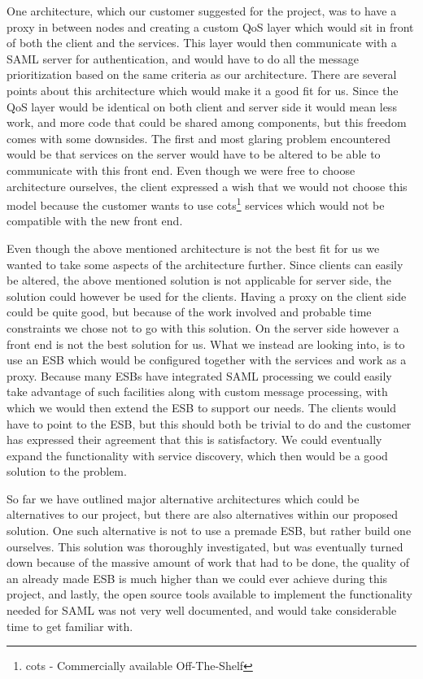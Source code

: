         One architecture, which our customer suggested for the project, was to have a proxy in between nodes and creating a custom QoS layer which would sit in front of both the client and the services. This layer would then communicate with a SAML server for authentication, and would have to do all the message prioritization based on the same criteria as our architecture. There are several points about this architecture which would make it a good fit for us. Since the QoS layer would be identical on both client and server side it would mean less work, and more code that could be shared among components, but this freedom comes with some downsides. The first and most glaring problem encountered would be that services on the server would have to be altered to be able to communicate with this front end. Even though we were free to choose architecture ourselves, the client expressed a wish that we would not choose this model because the customer wants to use \gls{cots}\footnote{\gls{cots} - Commercially available Off-The-Shelf} services which would not be compatible with the new front end.

        Even though the above mentioned architecture is not the best fit for us we wanted to take some aspects of the architecture further. Since clients can easily be altered, the above mentioned solution is not applicable for server side, the solution could however be used for the clients. Having a proxy on the client side could be quite good, but because of the work involved and probable time constraints we chose not to go with this solution. On the server side however a front end is not the best solution for us. What we instead are looking into, is to use an ESB which would be configured together with the services and work as a proxy. Because many ESBs have integrated SAML processing we could easily take advantage of such facilities along with custom message processing, with which we would then extend the ESB to support our needs. The clients would have to point to the ESB, but this should both be trivial to do and the customer has expressed their agreement that this is satisfactory. We could eventually expand the functionality with service discovery, which then would be a good solution to the problem.

        So far we have outlined major alternative architectures which could be alternatives to our project, but there are also alternatives within our proposed solution. One such alternative is not to use a premade ESB, but rather build one ourselves. This solution was thoroughly investigated, but was eventually turned down because of the massive amount of work that had to be done, the quality of an already made ESB is much higher than we could ever achieve during this project, and lastly, the open source tools available to implement the functionality needed for SAML was not very well documented, and would take considerable time to get familiar with.

